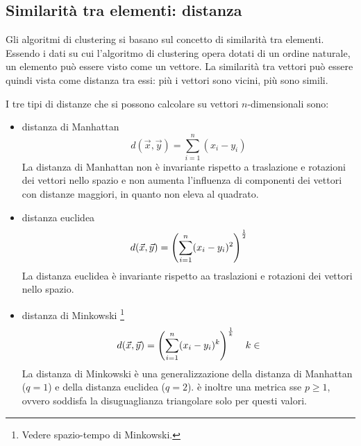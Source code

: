 \subsection{Similarità tra elementi: distanza}
Gli algoritmi di clustering si basano sul concetto di similarità tra elementi.
Essendo i dati su cui l'algoritmo di clustering opera dotati di un ordine naturale, un elemento può essere visto come un vettore.
La similarità tra vettori può essere quindi vista come distanza tra essi: più i vettori sono vicini, più sono simili.

I tre tipi di distanze che si possono calcolare su vettori $n$-dimensionali sono:
\begin{itemize}
    \item distanza di Manhattan
    \[
        d(\vec{x}, \vec{y}) = \sum\limits_{i=1}^n (x_i - y_i)
    \]
    La distanza di Manhattan non è invariante rispetto a traslazione e rotazioni dei vettori nello spazio e non aumenta l'influenza di componenti dei vettori con distanze maggiori, in quanto non eleva al quadrato.
    \item distanza euclidea
    \[
        d(\vec{x}, \vec{y}) = \left(\sum\limits_{i=1}^n (x_i - y_i)^2\right)^{\frac{1}{2}}
    \]
    La distanza euclidea è invariante rispetto aa traslazioni e rotazioni dei vettori nello spazio.
    \item distanza di Minkowski \footnote{Vedere spazio-tempo di Minkowski.}
    \[
        d(\vec{x}, \vec{y}) = \left(\sum\limits_{i=1}^n (x_i - y_i)^k\right)^{\frac{1}{k}} \quad k \in 
    \]
    La distanza di Minkowski è una generalizzazione della distanza di Manhattan ($q=1$) e della distanza euclidea ($q=2$).
    è inoltre una metrica sse $p \ge 1$, ovvero soddisfa la disuguaglianza triangolare solo per questi valori.
\end{itemize}